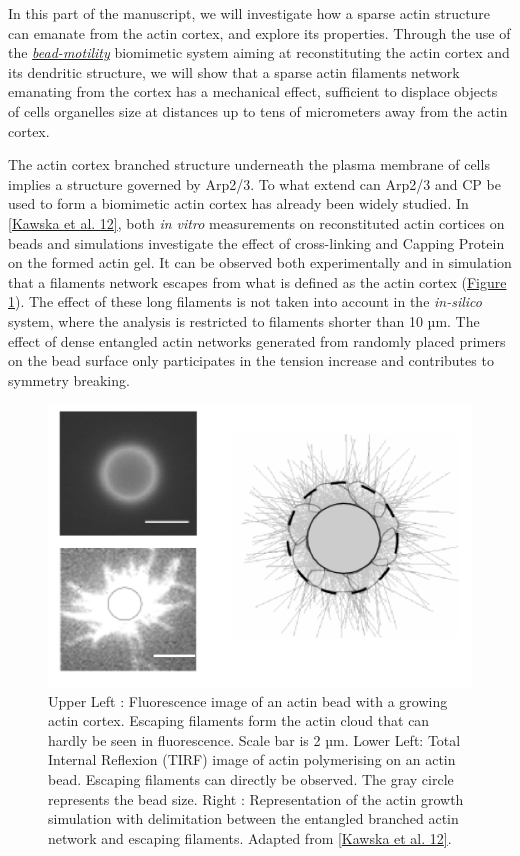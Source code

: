 \documentclass[A4paperpaper,11pt,english]{sphinxmanual}
\begin{document}
In this part of the manuscript, we will investigate how a sparse actin structure can
emanate from the actin cortex, and explore its properties. Through the use of the
{\hyperref[parts/part1:bead-motility-assay]{\emph{bead-motility}}} biomimetic system aiming at reconstituting
the actin cortex and its dendritic structure, we will show that a sparse actin filaments network
emanating from the cortex has a mechanical effect, sufficient to
displace objects of cells organelles size at distances up to tens of micrometers
away from the actin cortex.

The actin cortex branched structure underneath the plasma membrane of
cells implies a structure governed by Arp2/3. To what extend can Arp2/3 and CP be used
to form a biomimetic actin cortex has already been widely studied. In
{\hyperref[parts/part3:kawska2012]{{[}Kawska et al. 12{]}}}, both \emph{in vitro} measurements on reconstituted actin cortices
on beads and simulations investigate the effect of cross-linking and
Capping Protein on the formed actin gel. It can be observed both experimentally and in
simulation that a filaments network escapes from what is defined as the actin
cortex (\hyperref[parts/part3:fig-bead-tirf]{Figure  \ref*{parts/part3:fig-bead-tirf}}). The effect of these long filaments is not taken into account in the
\emph{in-silico} system, where the analysis is restricted to filaments shorter than 10
µm. The effect of dense entangled actin networks generated from
randomly placed primers on the bead surface only participates in the tension increase and
contributes to symmetry breaking.
\begin{figure}[htbp]
\centering
\capstart

\includegraphics[width=0.700\linewidth]{Bead-tirf-fluo-sim.png}
\caption{Upper Left : Fluorescence image of an actin bead with a growing actin
cortex. Escaping filaments form the actin cloud that can  hardly  be seen
in fluorescence. Scale bar is 2 µm. Lower Left: Total Internal Reflexion
(TIRF) image of actin polymerising on an actin bead. Escaping filaments can
directly be observed. The gray circle represents the bead size.  Right :
Representation of the actin growth simulation with delimitation between the
entangled branched actin network and escaping filaments.  Adapted from
{\hyperref[parts/part3:kawska2012]{{[}Kawska et al. 12{]}}}.}\label{parts/part3:fig-bead-tirf}\end{figure}
\end{document}
